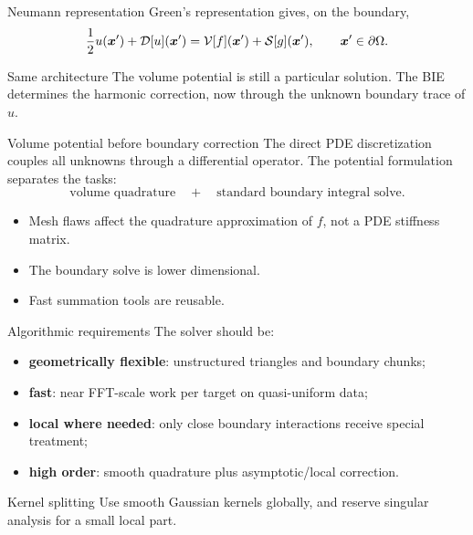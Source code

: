 \documentclass[aspectratio=169,11pt]{beamer}
\newcommand{\xp}{\bm{x}'}
\begin{document}
\begin{frame}{Neumann representation}
\small
Green's representation gives, on the boundary,
\[
  \frac12 u(\xp)+\Dop[u](\xp)
  =
  \Vop[f](\xp)+\Sop[g](\xp),
  \qquad \xp\in\partial\Omega.
\]

\begin{block}{Same architecture}
The volume potential is still a particular solution. The BIE determines the
harmonic correction, now through the unknown boundary trace of $u$.
\end{block}
\end{frame}

\begin{frame}{Volume potential before boundary correction}
\small
The direct PDE discretization couples all unknowns through a differential
operator. The potential formulation separates the tasks:
\[
  \boxed{\text{volume quadrature}}
  \quad+\quad
  \boxed{\text{standard boundary integral solve}}.
\]

\begin{itemize}
  \item Mesh flaws affect the quadrature approximation of $f$, not a PDE stiffness matrix.
  \item The boundary solve is lower dimensional.
  \item Fast summation tools are reusable.
\end{itemize}
\end{frame}

\begin{frame}{Algorithmic requirements}
\small
The solver should be:
\begin{itemize}
  \item \textbf{geometrically flexible}: unstructured triangles and boundary chunks;
  \item \textbf{fast}: near FFT-scale work per target on quasi-uniform data;
  \item \textbf{local where needed}: only close boundary interactions receive special treatment;
  \item \textbf{high order}: smooth quadrature plus asymptotic/local correction.
\end{itemize}

\begin{block}{Kernel splitting}
Use smooth Gaussian kernels globally, and reserve singular analysis for a small
local part.
\end{block}

\end{frame}
\end{document}
